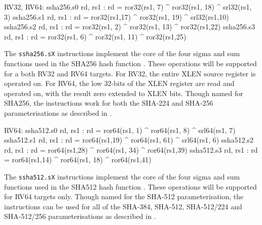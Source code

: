 \begin{cryptoisa}
RV32, RV64:
    ssha256.s0 rd, rs1 : rd = ror32(rs1, 7) ^ ror32(rs1, 18) ^ srl32(rs1, 3)
    ssha256.s1 rd, rs1 : rd = ror32(rs1,17) ^ ror32(rs1, 19) ^ srl32(rs1,10)
    ssha256.s2 rd, rs1 : rd = ror32(rs1, 2) ^ ror32(rs1, 13) ^ ror32(rs1,22)
    ssha256.s3 rd, rs1 : rd = ror32(rs1, 6) ^ ror32(rs1, 11) ^ ror32(rs1,25)
\end{cryptoisa}

The {\tt ssha256.sX}
instructions implement the core of the four sigma and sum functions used in
the SHA256 hash function \cite[Section 4.1.2]{nist:fips:180:4}.
These operations will be supported for a both RV32 and RV64 targets.
For RV32, the entire XLEN source register is operated on.
For RV64, the low 32-bits of the XLEN register are read and operated on,
with the result zero extended to XLEN bits.
Though named for SHA256, the instructions work for both the
SHA-224 and SHA-256 parameterisations as described in
\cite{nist:fips:180:4}.


\begin{cryptoisa}
RV64:
    ssha512.s0 rd, rs1 : rd = ror64(rs1, 1) ^ ror64(rs1,  8) ^ srl64(rs1, 7)
    ssha512.s1 rd, rs1 : rd = ror64(rs1,19) ^ ror64(rs1, 61) ^ srl64(rs1, 6)
    ssha512.s2 rd, rs1 : rd = ror64(rs1,28) ^ ror64(rs1, 34) ^ ror64(rs1,39)
    ssha512.s3 rd, rs1 : rd = ror64(rs1,14) ^ ror64(rs1, 18) ^ ror64(rs1,41)
\end{cryptoisa}

The {\tt ssha512.sX}
instructions implement the core of the four sigma and sum functions used in
the SHA512 hash function \cite[Section 4.1.3]{nist:fips:180:4}.
These operations will be supported for RV64 targets only.
Though named for the SHA-512 parameterisation, the instructions
can be used for all of the SHA-384, SHA-512, SHA-512/224 and SHA-512/256
parameterisations as described in \cite{nist:fips:180:4}.


